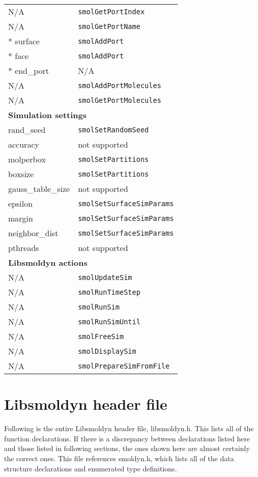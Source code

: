 \documentclass {book}
\begin{document}
\begin{longtable}[c]{ll}
N/A & \texttt{smolGetPortIndex}\\
N/A & \texttt{smolGetPortName}\\
{*} surface & \texttt{smolAddPort}\\
{*} face & \texttt{smolAddPort}\\
{*} end\_port & N/A\\
N/A & \texttt{smolAddPortMolecules}\\
N/A & \texttt{smolGetPortMolecules}\\
\hline
\multicolumn{2}{l}{\hspace{0.3in}\textbf{Simulation settings}}\\
\hline
rand\_seed & \texttt{smolSetRandomSeed}\\
accuracy & not supported\\
molperbox & \texttt{smolSetPartitions}\\
boxsize & \texttt{smolSetPartitions}\\
gauss\_table\_size & not supported\\
epsilon & \texttt{smolSetSurfaceSimParams}\\
margin & \texttt{smolSetSurfaceSimParams}\\
neighbor\_dist & \texttt{smolSetSurfaceSimParams}\\
pthreads & not supported\\
\hline
\multicolumn{2}{l}{\hspace{0.3in}\textbf{Libsmoldyn actions}}\\
\hline
N/A & \texttt{smolUpdateSim}\\
N/A & \texttt{smolRunTimeStep}\\
N/A & \texttt{smolRunSim}\\
N/A & \texttt{smolRunSimUntil}\\
N/A & \texttt{smolFreeSim}\\
N/A & \texttt{smolDisplaySim}\\
N/A & \texttt{smolPrepareSimFromFile}\\
\end{longtable}


\chapter{Libsmoldyn header file}

Following is the entire Libsmoldyn header file, libsmoldyn.h.  This lists all of the function declarations.  If there is a discrepancy between declarations listed here and those listed in following sections, the ones shown here are almost certainly the correct ones.  This file references smoldyn.h, which lists all of the data structure declarations and enumerated type definitions.
\end{document}
